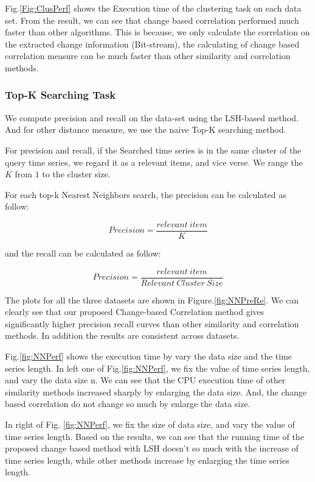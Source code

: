 Fig.\ref{Fig:ClusPerf} shows the Execution time of the clustering task on each data set. From the result, we can see that change based correlation performed much faster than other algorithms. This is because, we only calculate the correlation on the extracted change information (Bit-stream), the calculating of change based correlation measure can be much faster than other similarity and correlation methods.


\subsubsection{Top-K Searching Task}

We compute precision and recall \cite{powers2011evaluation} on the data-set using the LSH-based method. And for other distance measure, we use the naive Top-K searching method. 

For precision and recall, if the Searched time series is in the same cluster of the query time series, we regard it as a relevant items, and vice verse. We range the $K$ from $1$ to the cluster size. 

For each top-k Nearest Neighbors search, the precision can be calculated as follow:

\begin{equation}
Precision =\frac{relevant~item}{K} 
\end{equation}

and the recall can be calculated as follow:

\begin{equation}
Precision =\frac{relevant~item}{Relevant~Cluster~Size} 
\end{equation}

The plots for all the three datasets are shown in Figure.\ref{fig:NNPreRe}.
We can clearly see that our proposed Change-based Correlation method gives significantly higher precision recall curves than other similarity and correlation methods. In addition the results are consistent across datasets.

Fig.\ref{fig:NNPerf} shows the execution time by vary the data size and the time series length.
In left one of Fig.\ref{fig:NNPerf}, we fix the value of time series length, and
vary the data size n. We can see that the CPU execution
time of other similarity methods increased sharply by enlarging the data size. 
And, the change based correlation do not change so much by enlarge the data size.

In right of Fig. \ref{fig:NNPerf}, we fix the size of data size, and vary the value of time series length. Based on the results, we can see that the running time of the proposed change based method with LSH doesn't so much with the increase of time series length, while other methods increase by enlarging the time series length.

